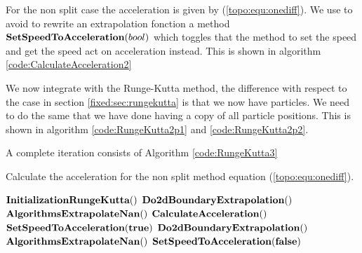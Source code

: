 For the non split case the acceleration is given by (\ref{topo:equ:onediff}).
We use to avoid to rewrite an extrapolation fonction a method $\mathop{\textbf{SetSpeedToAcceleration}}(bool)$
which toggles that the method to set the speed and get the speed act on acceleration instead.
This is shown in algorithm \ref{code:CalculateAcceleration2}

We now integrate with the Runge-Kutta method, the difference with respect to the case in section \ref{fixed:sec:rungekutta}
is that we now have particles. We need to do the same that we have done having a copy of all particle positions.
This is shown in algorithm \ref{code:RungeKutta2p1} and \ref{code:RungeKutta2p2}.

A complete iteration consists of Algorithm \ref{code:RungeKutta3}

\begin{algorithm}
\caption{Calculate the acceleration for the non split method equation (\ref{topo:equ:onediff}).}
\label{code:CalculateAcceleration2}
\begin{algorithmic}[1]
	\State $\mathop{\textbf{InitializationRungeKutta}}()$
	\State $\mathop{\textbf{Do2dBoundaryExtrapolation}}()$
	\State $\mathop{\textbf{AlgorithmsExtrapolateNan}}()$
	\State $\mathop{\textbf{CalculateAcceleration}}()$
	\State $\mathop{\textbf{SetSpeedToAcceleration}}(\mathop{\textbf{true}})$
	\State $\mathop{\textbf{Do2dBoundaryExtrapolation}}()$
	\State $\mathop{\textbf{AlgorithmsExtrapolateNan}}()$
	\State $\mathop{\textbf{SetSpeedToAcceleration}}(\mathop{\textbf{false}})$
\EndProcedure
        \end{algorithmic}
\end{algorithm}


